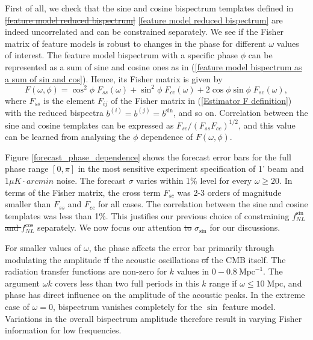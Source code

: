 \documentclass[a4paper,12pt,times,custombib,print,index]{Classes/PhDThesisPSnPDF} %
\providecommand{\DIFadd}[1]{{\protect\color{blue}\uwave{#1}}} %
\providecommand{\DIFdel}[1]{{\protect\color{red}\sout{#1}}}                      %
\providecommand{\DIFaddbegin}{} %
\providecommand{\DIFaddend}{} %
\providecommand{\DIFdelbegin}{} %
\providecommand{\DIFdelend}{} %
\newcommand{\DIFscaledelfig}{0.5}
\newlength{\DIFdelgraphicswidth} %
\newlength{\DIFdelgraphicsheight} %
\newcommand{\DIFaddincludegraphics}[2][]{{\color{blue}\fbox{\DIFOincludegraphics[#1]{#2}}}} %
\newcommand{\DIFdelincludegraphics}[2][]{%
\sbox{\DIFdelgraphicsbox}{\DIFOincludegraphics[#1]{#2}}%
\settoboxwidth{\DIFdelgraphicswidth}{\DIFdelgraphicsbox} %
\settoboxtotalheight{\DIFdelgraphicsheight}{\DIFdelgraphicsbox} %
\scalebox{\DIFscaledelfig}{%
\parbox[b]{\DIFdelgraphicswidth}{\usebox{\DIFdelgraphicsbox}\\[-\baselineskip] \rule{\DIFdelgraphicswidth}{0em}}\llap{\resizebox{\DIFdelgraphicswidth}{\DIFdelgraphicsheight}{%
\setlength{\unitlength}{\DIFdelgraphicswidth}%
\begin{picture}(1,1)%
\thicklines\linethickness{2pt} %
{\color[rgb]{1,0,0}\put(0,0){\framebox(1,1){}}}%
{\color[rgb]{1,0,0}\put(0,0){\line( 1,1){1}}}%
{\color[rgb]{1,0,0}\put(0,1){\line(1,-1){1}}}%
\end{picture}%
}\hspace*{3pt}}} %
} %
\DeclareRobustCommand{\DIFaddbegin}{\DIFOaddbegin \let\includegraphics\DIFaddincludegraphics} %
\DeclareRobustCommand{\DIFaddend}{\DIFOaddend \let\includegraphics\DIFOincludegraphics} %
\DeclareRobustCommand{\DIFdelbegin}{\DIFOdelbegin \let\includegraphics\DIFdelincludegraphics} %
\DeclareRobustCommand{\DIFdelend}{\DIFOaddend \let\includegraphics\DIFOincludegraphics} %
\begin{document}
First of all, we check that the sine and cosine bispectrum templates defined in \DIFdelbegin \DIFdel{\ref{feature model reduced bispectrum} }\DIFdelend \DIFaddbegin \eqref{feature model reduced bispectrum} \DIFaddend are indeed uncorrelated and can be constrained separately. We see if the Fisher matrix of feature models is robust to changes in the phase for different $\omega$ values of interest. The feature model bispectrum with a specific phase $\phi$ can be represented as a sum of sine and cosine ones as in (\ref{feature model bispectrum as a sum of sin and cos}). Hence, its Fisher matrix is given by
\begin{equation}
	F(\omega, \phi) = \cos^2\phi \; F_{ss}(\omega) + \sin^2\phi \; F_{cc}(\omega) + 2\cos\phi\sin\phi \; F_{sc}(\omega),
\end{equation}
where $F_{ss}$ is the element $F_{ij}$ of the Fisher matrix in (\ref{Estimator F definition}) with the reduced bispectra $b^{(i)} = b^{(j)} = b^{\sin}$, and so on. Correlation between the sine and cosine templates can be expressed as $F_{sc}/(F_{ss}F_{cc})^{1/2}$, and this value can be learned from analysing the $\phi$ dependence of $F(\omega,\phi)$.

Figure \ref{forecast_phase_dependence} shows the forecast error bars for the full phase range $[0,\pi]$ in the most sensitive experiment specification of 1' beam and 1$\mu K \cdot arcmin$ noise. The forecast $\sigma$ varies within \DIFaddbegin \DIFadd{a }\DIFaddend 1\% level for every $\omega\ge20$. In terms of the Fisher matrix, the cross term $F_{sc}$ was 2-3 orders of magnitude smaller than $F_{ss}$ and $F_{cc}$ for all cases. The correlation between the sine and cosine templates was less than 1\%. This justifies our previous choice of constraining \DIFdelbegin \DIFdel{$f_{NL}^{\sin}$ and $f_{NL}^{\cos}$ }\DIFdelend \DIFaddbegin \DIFadd{$f_\text{NL}^{\sin}$ and $f_\text{NL}^{\cos}$ }\DIFaddend separately. We now focus our attention \DIFdelbegin \DIFdel{to }\DIFdelend \DIFaddbegin \DIFadd{on }\DIFaddend $\sigma_{\sin}$ for our discussions.

For smaller values of $\omega$, the phase affects the error bar primarily through modulating the amplitude \DIFdelbegin \DIFdel{if }\DIFdelend \DIFaddbegin \DIFadd{of }\DIFaddend the acoustic oscillations \DIFdelbegin \DIFdel{of }\DIFdelend \DIFaddbegin \DIFadd{in }\DIFaddend the CMB itself. The radiation transfer functions are non-zero for $k$ values in $0 - 0.8 ~\text{Mpc}^{-1}$. The argument $\omega k$ covers less than two full periods in this $k$ range if $\omega \le 10\; \text{Mpc}$, and phase has \DIFaddbegin \DIFadd{a }\DIFaddend direct influence on the amplitude of the acoustic peaks. In the extreme case of $\omega=0$, \DIFaddbegin \DIFadd{the }\DIFaddend bispectrum vanishes completely for the \DIFdelbegin \DIFdel{$\sin$ }\DIFdelend \DIFaddbegin \DIFadd{sine }\DIFaddend feature model. Variations in the overall bispectrum amplitude therefore result in varying Fisher information for low frequencies.
\end{document}

